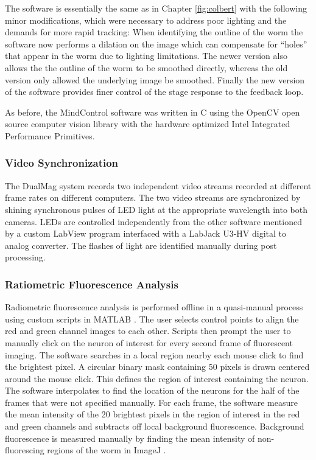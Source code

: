 The software is essentially the same as in Chapter \ref{fig:colbert} with the following minor modifications, which were necessary to address poor lighting and the demands for more rapid tracking: When identifying the outline of the worm the software now performs a dilation on the image \citep{bradski_learning_2008} which can compensate for ``holes'' that appear in the worm due to lighting limitations. The newer version also allows the the outline of the worm to be smoothed directly, whereas the old version only allowed the underlying image be smoothed. Finally the new version of the software provides finer control of the stage response to the feedback loop. 

As before, the MindControl software was written in C using the OpenCV open source computer vision library \citep{bradski_learning_2008, bradski_opencv_2000} with the hardware optimized Intel Integrated Performance Primitives. 


\subsubsection{Video Synchronization}
The DualMag system records two independent video streams recorded at different frame rates on different computers. The two video streams are synchronized by shining synchronous pulses of LED light at the appropriate wavelength into both cameras. LEDs are controlled independently from the other software mentioned by a custom LabView program  interfaced with a LabJack U3-HV digital to analog converter. The flashes of light are identified manually during post processing. 

\subsubsection{Ratiometric Fluorescence Analysis}
Radiometric fluorescence analysis is performed offline in a quasi-manual process using custom scripts in MATLAB \citep{matlab_version_2010}.  The user selects control points to align the red and green channel images to each other. Scripts then prompt the user to manually click on the neuron of interest for every second frame of fluorescent imaging. The software searches in a local region nearby each mouse click to find the brightest pixel. A circular binary mask containing 50 pixels is drawn centered around the mouse click. This defines the region of interest containing the neuron.  The software interpolates to find the location of the neurons for the half of the frames that were not specified manually. For each frame, the software measure the mean intensity of the 20 brightest pixels in the region of interest in the red and green channels and subtracts off local background fluorescence. Background fluorescence is measured manually by finding the mean intensity of non-fluorescing regions of the worm in ImageJ \citep{rasband_image_1997}.

